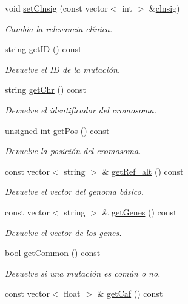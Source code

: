 \begin{DoxyCompactItemize}
void \hyperlink{classmutacion_ad69eed035c3c25f23bc587d9e6f99c05}{set\-Clnsig} (const vector$<$ int $>$ \&\hyperlink{classmutacion_adc0290c4a6db7f4c7341b0183c7ef534}{clnsig})
\begin{DoxyCompactList}\small\item\em Cambia la relevancia clínica. \end{DoxyCompactList}\item 
string \hyperlink{classmutacion_a6e3fa261f38b413aff9172fe065da8b8}{get\-I\-D} () const 
\begin{DoxyCompactList}\small\item\em Devuelve el I\-D de la mutación. \end{DoxyCompactList}\item 
string \hyperlink{classmutacion_aefb0a9a6a8278f0d192ebc044198399c}{get\-Chr} () const 
\begin{DoxyCompactList}\small\item\em Devuelve el identificador del cromosoma. \end{DoxyCompactList}\item 
unsigned int \hyperlink{classmutacion_ad08cb3c30da4195adc3c22d0b4c8edd7}{get\-Pos} () const 
\begin{DoxyCompactList}\small\item\em Devuelve la posición del cromosoma. \end{DoxyCompactList}\item 
const vector$<$ string $>$ \& \hyperlink{classmutacion_adf0f88ffeeae6efe264e7da753a1d401}{get\-Ref\-\_\-alt} () const 
\begin{DoxyCompactList}\small\item\em Devuelve el vector del genoma básico. \end{DoxyCompactList}\item 
const vector$<$ string $>$ \& \hyperlink{classmutacion_a7db0fc59cb1b2e32213aa9475371cc37}{get\-Genes} () const 
\begin{DoxyCompactList}\small\item\em Devuelve el vector de los genes. \end{DoxyCompactList}\item 
bool \hyperlink{classmutacion_abc353016535a561fbd8e902c83861228}{get\-Common} () const 
\begin{DoxyCompactList}\small\item\em Devuelve si una mutación es común o no. \end{DoxyCompactList}\item 
const vector$<$ float $>$ \& \hyperlink{classmutacion_a99e3e5665d54f597f66c35ab312a79c8}{get\-Caf} () const 

\end{DoxyCompactItemize}

